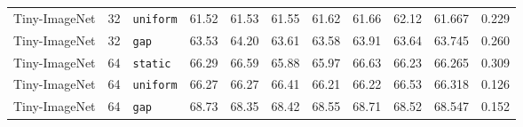 \documentclass[10pt,a4paper]{article}
\begin{document}
\begin{table}[h]
\begin{tabular}{l r l rrrrrr rr}
Tiny-ImageNet & 32 & \texttt{uniform} & 61.52 & 61.53 & 61.55 & 61.62 & 61.66 & 62.12 & 61.667 & 0.229 \\
Tiny-ImageNet & 32 & \texttt{gap} & 63.53 & 64.20 & 63.61 & 63.58 & 63.91 & 63.64 & 63.745 & 0.260 \\
Tiny-ImageNet & 64 & \texttt{static} & 66.29 & 66.59 & 65.88 & 65.97 & 66.63 & 66.23 & 66.265 & 0.309 \\
Tiny-ImageNet & 64 & \texttt{uniform} & 66.27 & 66.27 & 66.41 & 66.21 & 66.22 & 66.53 & 66.318 & 0.126 \\
Tiny-ImageNet & 64 & \texttt{gap} & 68.73 & 68.35 & 68.42 & 68.55 & 68.71 & 68.52 & 68.547 & 0.152 \\
\bottomrule
\end{tabular}
\end{table}
\end{document}
